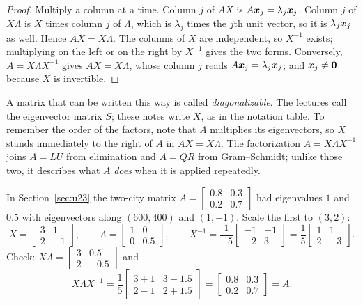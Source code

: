 \begin{proof}
Multiply a column at a time. Column $j$ of $AX$ is $A\boldsymbol{x}_j=\lambda_j\boldsymbol{x}_j$. Column $j$
of $X\Lambda$ is $X$ times column $j$ of $\Lambda$, which is $\lambda_j$ times the $j$th
unit vector, so it is $\lambda_j\boldsymbol{x}_j$ as well. Hence $AX=X\Lambda$. The columns of $X$ are
independent, so $X^{-1}$ exists; multiplying on the left or on the right by $X^{-1}$ gives
the two forms. Conversely, $A=X\Lambda X^{-1}$ gives $AX=X\Lambda$, whose column $j$ reads
$A\boldsymbol{x}_j=\lambda_j\boldsymbol{x}_j$; and $\boldsymbol{x}_j\neq\boldsymbol{0}$ because $X$ is invertible.
\end{proof}

A matrix that can be written this way is called \emph{diagonalizable}. The lectures call the
eigenvector matrix $S$; these notes write $X$, as in the notation table. To remember the
order of the factors, note that $A$ multiplies its eigenvectors, so $X$ stands immediately to
the right of $A$ in $AX=X\Lambda$. The factorization $A=X\Lambda X^{-1}$ joins $A=LU$ from
elimination and $A=QR$ from Gram--Schmidt; unlike those two, it describes what $A$
\emph{does} when it is applied repeatedly.

\begin{example}\label{ex:u24-diag}
In Section~\ref{sec:u23} the two-city matrix
$A=\left[\begin{smallmatrix} 0.8&0.3\\ 0.2&0.7\end{smallmatrix}\right]$ had eigenvalues $1$
and $0.5$ with eigenvectors along $(600,400)$ and $(1,-1)$. Scale the first to $(3,2)$:
\[
  X=\begin{bmatrix} 3&1\\ 2&-1\end{bmatrix},\qquad
  \Lambda=\begin{bmatrix} 1&0\\ 0&0.5\end{bmatrix},\qquad
  X^{-1}=\frac{1}{-5}\begin{bmatrix} -1&-1\\ -2&3\end{bmatrix}
  =\frac15\begin{bmatrix} 1&1\\ 2&-3\end{bmatrix}.
\]
Check: $X\Lambda=\left[\begin{smallmatrix} 3&0.5\\ 2&-0.5\end{smallmatrix}\right]$ and
\[
  X\Lambda X^{-1}=\frac15\begin{bmatrix} 3+1 & 3-1.5\\ 2-1 & 2+1.5\end{bmatrix}
  =\begin{bmatrix} 0.8&0.3\\ 0.2&0.7\end{bmatrix}=A .
\]
\end{example}

